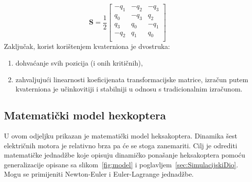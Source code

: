 \documentclass[times, utf8, diplomski]{fer}
\begin{document}
\begin{equation}
	\mathbf{S} = \frac{1}{2}
	\begin{bmatrix}
	-q_1 & -q_2 & -q_3 \\
	q_0 & -q_3 & q_2 \\
	q_3 & q_0 & -q_1 \\
	-q_2 & q_1 & q_0 \\
	\end{bmatrix}
	\label{eq:matS}
\end{equation}
Zaključak, korist korištenjem kvaterniona je dvostruka: \begin{enumerate}
\item dohvaćanje svih pozicija (i onih kritičnih),
\item zahvaljujući linearnosti koeficijenata transformacijske matrice, izračun putem kvaterniona je učinkovitiji i stabilniji u odnosu s tradicionalnim izračunom.
\end{enumerate}

\subsection{Matematički model hexkoptera}
U ovom odjeljku prikazan je matematički model heksakoptera.  Dinamika šest električnih motora je relativno brza pa će se stoga zanemariti. Cilj je odrediti matematičke jednadžbe koje opisuju dinamičko ponašanje heksakoptera pomoću generalizacije opisane sa slikom~\ref{fig:model} i poglavljem~\ref{sec:SimulacijskiDio}. Mogu se primijeniti Newton-Euler i Euler-Lagrange jednadžbe.\\
\end{document}
